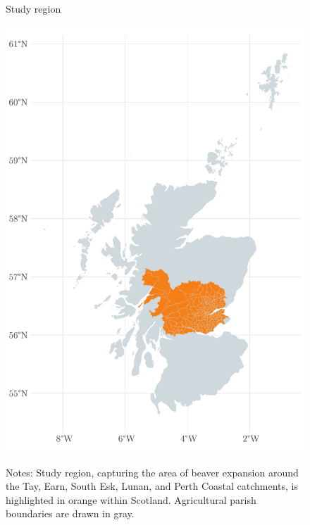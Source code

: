 \begin{figure}
    \centering
    \caption{Study region}
    \includegraphics[width=0.5\linewidth]{output/figures/study_area.pdf}
    \label{fig:study-area}
    \caption*{\justifying \footnotesize Notes: Study region, capturing the area of beaver expansion around the Tay, Earn, South Esk, Lunan, and Perth Coastal catchments, is highlighted in orange within Scotland. Agricultural parish boundaries are drawn in gray.}
\end{figure}